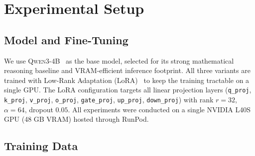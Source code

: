 \documentclass{article}
\begin{document}
\begin{table}[!htbp]
\centering
\caption{Evaluation Accuracy (Mean \% $\pm$ Std Dev across runs)}
\label{tab:main_results}
\end{table}



\section{Experimental Setup}

\subsection{Model and Fine-Tuning}

We use \textsc{Qwen3-4B}~\cite{yang2025qwen3technicalreport} as the base model, selected for its strong mathematical reasoning baseline and VRAM-efficient inference footprint. All three variants are trained with Low-Rank Adaptation (LoRA)~\cite{hu2021loralowrankadaptationlarge} to keep the training tractable on a single GPU. The LoRA configuration targets all linear projection layers (\texttt{q\_proj}, \texttt{k\_proj}, \texttt{v\_proj}, \texttt{o\_proj}, \texttt{gate\_proj}, \texttt{up\_proj}, \texttt{down\_proj}) with rank $r=32$, $\alpha=64$, dropout $0.05$. All experiments were conducted on a single NVIDIA L40S GPU (48 GB VRAM) hosted through RunPod.

\subsection{Training Data}
\end{document}
